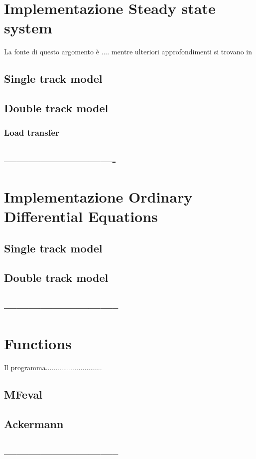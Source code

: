 \section{Implementazione Steady state system}
La fonte di questo argomento è .... mentre ulteriori approfondimenti si trovano in 

\subsection{Single track model}


\subsection{Double track model}

\subsubsection{Load transfer}

\subsection{----------------------------}


\section{Implementazione Ordinary Differential Equations}

\subsection{Single track model}



\subsection{Double track model}



\subsection{-----------------------------}




\section{Functions}

Il programma.............................

\subsection{MFeval}

\subsection{Ackermann}

\subsection{-----------------------------}

